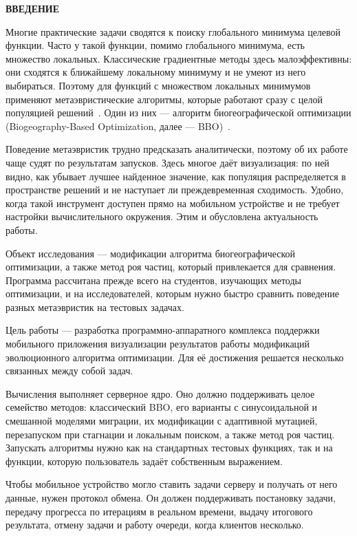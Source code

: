 \documentclass[14pt, a4paper]{extarticle}
\newcommand{\structelem}[1]{%
  \clearpage
  \phantomsection
  \addcontentsline{toc}{section}{#1}%
  \begin{center}\large\bfseries #1\end{center}
  \vspace{8pt}}
\begin{document}
\structelem{ВВЕДЕНИЕ}

Многие практические задачи сводятся к поиску глобального минимума целевой
функции. Часто у такой функции, помимо глобального минимума, есть множество
локальных. Классические градиентные методы здесь малоэффективны: они сходятся
к ближайшему локальному минимуму и не умеют из него выбираться. Поэтому для
функций с множеством локальных минимумов применяют метаэвристические алгоритмы,
которые работают сразу с целой популяцией решений~\cite{karpenko2021}. Один из
них --- алгоритм биогеографической оптимизации (Biogeography-Based
Optimization, далее --- BBO)~\cite{simon2020, karpenko2013bbo}.

Поведение метаэвристик трудно предсказать аналитически, поэтому об их работе
чаще судят по результатам запусков. Здесь многое даёт визуализация: по ней
видно, как убывает лучшее найденное значение, как популяция распределяется в
пространстве решений и не наступает ли преждевременная сходимость. Удобно, когда
такой инструмент доступен прямо на мобильном устройстве и не требует настройки
вычислительного окружения. Этим и обусловлена актуальность работы.

Объект исследования --- модификации алгоритма биогеографической оптимизации,
а также метод роя частиц, который привлекается для сравнения. Программа
рассчитана прежде всего на студентов, изучающих методы оптимизации, и на
исследователей, которым нужно быстро сравнить поведение разных метаэвристик на
тестовых задачах.

Цель работы --- разработка программно-аппаратного комплекса поддержки мобильного
приложения визуализации результатов работы модификаций эволюционного алгоритма
оптимизации. Для её достижения решается несколько связанных между собой задач.

Вычисления выполняет серверное ядро. Оно должно поддерживать целое семейство
методов: классический BBO, его варианты с синусоидальной и смешанной моделями
миграции, их модификации с адаптивной мутацией, перезапуском при стагнации и
локальным поиском, а также метод роя частиц. Запускать алгоритмы нужно как на
стандартных тестовых функциях, так и на функции, которую пользователь задаёт
собственным выражением.

Чтобы мобильное устройство могло ставить задачи серверу и получать от него
данные, нужен протокол обмена. Он должен поддерживать постановку задачи, передачу
прогресса по итерациям в реальном времени, выдачу итогового результата, отмену
задачи и работу очереди, когда клиентов несколько.
\end{document}
